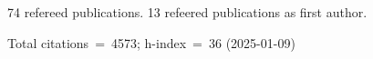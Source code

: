 74 refereed publications. 13 refeered publications as first author.

Total citations~=~4573; h-index~=~36 (2025-01-09)